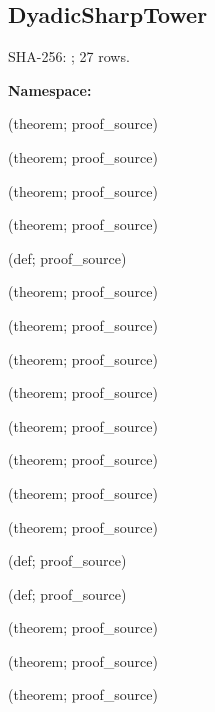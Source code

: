 \subsection*{DyadicSharpTower}
{\footnotesize SHA-256: ; 27 rows.}\par
\begingroup\small
\textbf{Namespace:} \par
\noindent{} {\scriptsize (theorem; proof\_source)}\par
\noindent{} {\scriptsize (theorem; proof\_source)}\par
\noindent{} {\scriptsize (theorem; proof\_source)}\par
\noindent{} {\scriptsize (theorem; proof\_source)}\par
\noindent{} {\scriptsize (def; proof\_source)}\par
\noindent{} {\scriptsize (theorem; proof\_source)}\par
\noindent{} {\scriptsize (theorem; proof\_source)}\par
\noindent{} {\scriptsize (theorem; proof\_source)}\par
\noindent{} {\scriptsize (theorem; proof\_source)}\par
\noindent{} {\scriptsize (theorem; proof\_source)}\par
\noindent{} {\scriptsize (theorem; proof\_source)}\par
\noindent{} {\scriptsize (theorem; proof\_source)}\par
\noindent{} {\scriptsize (theorem; proof\_source)}\par
\noindent{} {\scriptsize (def; proof\_source)}\par
\noindent{} {\scriptsize (def; proof\_source)}\par
\noindent{} {\scriptsize (theorem; proof\_source)}\par
\noindent{} {\scriptsize (theorem; proof\_source)}\par
\noindent{} {\scriptsize (theorem; proof\_source)}\par
